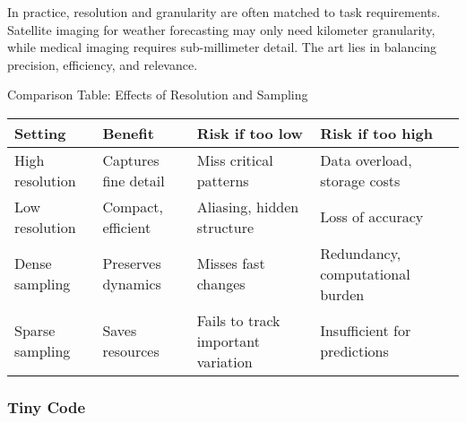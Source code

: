 \documentclass[
  letterpaper,
  DIV=11,
  numbers=noendperiod]{scrreprt}
\begin{document}
In practice, resolution and granularity are often matched to task
requirements. Satellite imaging for weather forecasting may only need
kilometer granularity, while medical imaging requires sub-millimeter
detail. The art lies in balancing precision, efficiency, and relevance.

Comparison Table: Effects of Resolution and Sampling

\begin{longtable}[]{@{}
  >{\raggedright\arraybackslash}p{}
  >{\raggedright\arraybackslash}p{}
  >{\raggedright\arraybackslash}p{}
  >{\raggedright\arraybackslash}p{}@{}}
\toprule\noalign{}
\begin{minipage}[b]{\linewidth}\raggedright
Setting
\end{minipage} & \begin{minipage}[b]{\linewidth}\raggedright
Benefit
\end{minipage} & \begin{minipage}[b]{\linewidth}\raggedright
Risk if too low
\end{minipage} & \begin{minipage}[b]{\linewidth}\raggedright
Risk if too high
\end{minipage} \\
\midrule\noalign{}
\endhead
\bottomrule\noalign{}
\endlastfoot
High resolution & Captures fine detail & Miss critical patterns & Data
overload, storage costs \\
Low resolution & Compact, efficient & Aliasing, hidden structure & Loss
of accuracy \\
Dense sampling & Preserves dynamics & Misses fast changes & Redundancy,
computational burden \\
Sparse sampling & Saves resources & Fails to track important variation &
Insufficient for predictions \\
\end{longtable}

\subsubsection{Tiny Code}\label{tiny-code-73}
\end{document}
